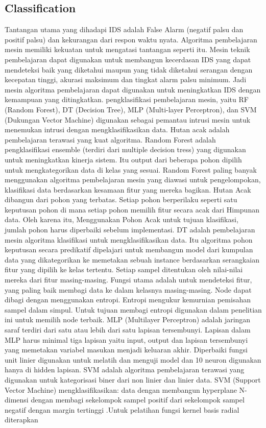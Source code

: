 \documentclass[conference]{IEEEtran}
\begin{document}
\subsection{Classification}
Tantangan utama yang dihadapi IDS adalah False Alarm (negatif palsu dan positif palsu) dan kekurangan dari respon waktu nyata. Algoritma pembelajaran mesin memiliki kekuatan untuk mengatasi tantangan seperti itu. Mesin teknik pembelajaran dapat digunakan untuk membangun kecerdasan IDS yang dapat mendeteksi baik yang diketahui maupun yang tidak diketahui serangan dengan kecepatan tinggi, akurasi maksimum dan tingkat alarm palsu minimum\cite{masoodi2019symmetric}\cite{jabbar2017rfaode}. Jadi mesin algoritma pembelajaran dapat digunakan untuk meningkatkan IDS dengan kemampuan yang ditingkatkan. pengklasifikasi pembelajaran mesin, yaitu RF (Random Forest), DT (Decision Tree), MLP (Multi-layer Perceptron), dan SVM (Dukungan Vector Machine) digunakan sebagai pemantau intrusi mesin untuk menemukan intrusi dengan mengklasifikasikan data. Hutan acak adalah pembelajaran terawasi yang kuat algoritma. Random Forest adalah pengklasifikasi ensemble (terdiri dari multiple decision tress) yang digunakan untuk meningkatkan kinerja sistem\cite{rutkowski2012decision}. Itu output dari beberapa pohon dipilih untuk mengkategorikan data di kelas yang sesuai. Random Forest paling banyak menggunakan algoritma pembelajaran mesin yang diawasi untuk pengelompokan, klasifikasi data berdasarkan kesamaan fitur yang mereka bagikan. Hutan Acak dibangun dari pohon yang terbatas. Setiap pohon berperilaku seperti satu keputusan pohon di mana setiap pohon memilih fitur secara acak dari Himpunan data. Oleh karena itu, Menggunakan Pohon Acak untuk tujuan klasifikasi, jumlah pohon harus diperbaiki sebelum implementasi. DT adalah pembelajaran mesin algoritma klasifikasi untuk mengklasifikasikan data. Itu algoritma pohon keputusan secara predikatif dipelajari untuk membangun model dari kumpulan data yang dikategorikan ke memetakan sebuah instance berdasarkan serangkaian fitur yang dipilih ke kelas tertentu\cite{alsmadi2017sdn}. Setiap sampel ditentukan oleh nilai-nilai mereka dari fitur masing-masing. Fungsi utama adalah untuk mendeteksi fitur, yang paling baik membagi data ke dalam kelasnya masing-masing. Node dapat dibagi dengan menggunakan entropi. Entropi mengukur kemurnian pemisahan sampel dalam simpul. Untuk tujuan membagi entropi digunakan dalam penelitian ini untuk memilih node terbaik. MLP (Multilayer Perceptron) adalah jaringan saraf terdiri dari satu atau lebih dari satu lapisan tersembunyi. Lapisan dalam MLP harus minimal tiga lapisan yaitu input, output dan lapisan tersembunyi yang memetakan variabel masukan menjadi keluaran akhir\cite{sain1996nature}. Diperbaiki fungsi unit linier digunakan untuk melatih dan menguji model dan 10 neuron digunakan hanya di hidden lapisan. SVM adalah algoritma pembelajaran terawasi yang digunakan untuk kategorisasi biner dari non linier dan linier data. SVM (Support Vector Machine) mengklasifikasikan: data dengan membangun hyperplane N-dimensi dengan membagi sekelompok sampel positif dari sekelompok sampel negatif dengan margin tertinggi \cite{yang2015evaluating}\cite{sain1996nature}.Untuk pelatihan fungsi kernel basis radial diterapkan 
\end{document}
